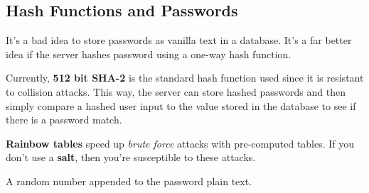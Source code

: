 \subsection{Hash Functions and Passwords}
It's a bad idea to store passwords as vanilla text in a database. It's a far better idea if the server hashes password using a one-way hash function. \par

Currently, \textbf{512 bit SHA-2} is the standard hash function used since it is resistant to collision attacks. This way, the server can store hashed passwords and then simply compare a hashed user input to the value stored in the database to see if there is a password match. \par

\textbf{Rainbow tables} speed up \emph{brute force} attacks with pre-computed tables. If you don't use a \textbf{salt}, then you're susceptible to these attacks.

\begin{definition}[Salt]
	A random number appended to the password plain text.
\end{definition}
